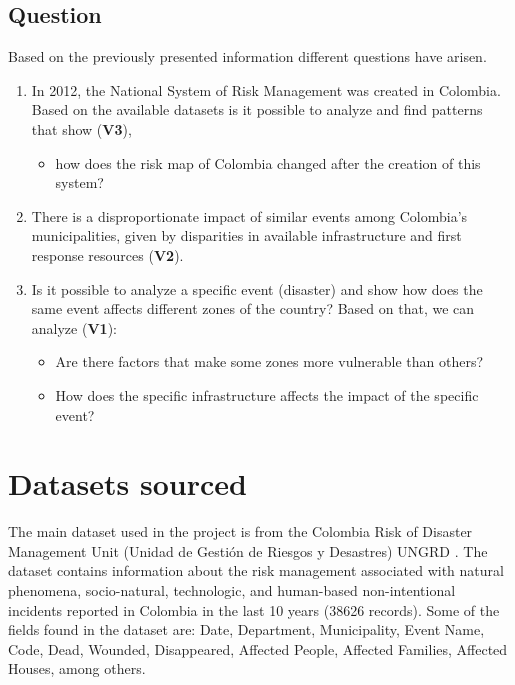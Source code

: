 \documentclass[11pt]{article}
\begin{document}
\subsection{Question}

Based on the previously presented information different questions have arisen.

\begin{enumerate}


\item{In 2012, the National System of Risk Management was created in Colombia. Based on the available datasets is it possible to analyze and find patterns that show (\textbf{V3}),
\begin{itemize}
\item how does the risk map of Colombia changed after the creation of this system?
\end{itemize}
}


\item{There is a disproportionate impact of similar events among Colombia's municipalities, given by disparities in available infrastructure and first response resources  (\textbf{V2}).}


\item{Is it possible to analyze a specific event (disaster) and show how does the same event  affects different zones of the country? Based on that, we can analyze (\textbf{V1}):
\begin{itemize}
\item Are there factors that make some zones more vulnerable than others?
\item How does the specific infrastructure affects the impact of the specific event?
\end{itemize}
}
\end{enumerate}



\section{Datasets sourced }
\label{sec:app}

The main dataset used in the project is from the Colombia Risk of Disaster Management Unit (Unidad de Gesti\'{o}n de Riesgos y Desastres) UNGRD \cite{datasetUNGRD}. The dataset contains information about  the risk management associated with natural phenomena, socio-natural, technologic, and human-based non-intentional incidents reported in Colombia in the last 10 years (38626 records). Some of the fields found in the dataset are: Date, Department, Municipality, Event Name, Code, Dead, Wounded, Disappeared, Affected People, Affected Families, Affected Houses, among others.
\end{document}
